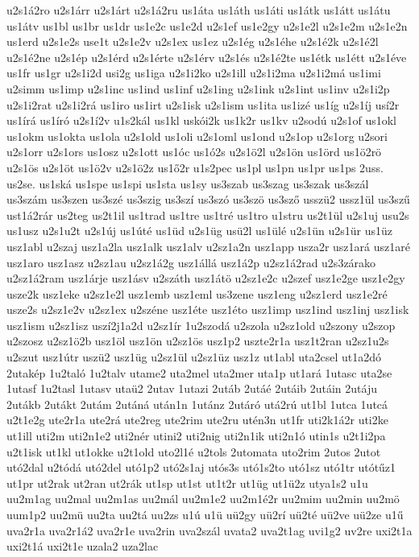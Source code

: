 {u2s1á2ro
u2s1árr
u2s1árt
u2s1á2ru
us1áta
us1áth
us1áti
us1átk
us1átt
us1átu
us1átv
us1bl
us1br
us1dr
us1e2c
us1e2d
u2s1ef
us1e2gy
u2s1e2l
u2s1e2m
u2s1e2n
us1erd
u2s1e2s
use1t
u2s1e2v
u2s1ex
us1ez
u2s1ég
u2s1éhe
u2s1é2k
u2s1é2l
u2s1é2ne
u2s1ép
u2s1érd
u2s1érte
u2s1érv
u2s1és
u2s1é2te
us1étk
us1étt
u2s1éve
us1fr
us1gr
u2s1i2d
usi2g
us1iga
u2s1i2ko
u2s1ill
u2s1i2ma
u2s1i2má
us1imi
u2simm
us1imp
u2s1inc
us1ind
us1inf
u2s1ing
u2s1ink
u2s1int
us1inv
u2s1i2p
u2s1i2rat
u2s1i2rá
us1iro
us1irt
u2s1isk
u2s1ism
us1ita
us1izé
us1íg
u2s1íj
usí2r
us1írá
us1író
u2s1í2v
u1s2kál
us1kl
uskói2k
us1k2r
us1kv
u2sodú
u2s1of
us1okl
us1okm
us1okta
us1ola
u2s1old
us1oli
u2s1oml
us1ond
u2s1op
u2s1org
u2sori
u2s1orr
u2s1ors
us1osz
u2s1ott
us1óc
us1ó2s
u2s1ö2l
u2s1ön
us1örd
us1ö2rö
u2s1ös
u2s1öt
us1ö2v
u2s1ö2z
us1ő2r
u1s2pec
us1pl
us1pn
us1pr
us1ps
2uss.
us2se.
us1ská
us1spe
us1spi
us1sta
us1sy
us3szab
us3szag
us3szak
us3szál
us3szám
us3szen
us3szé
us3szig
us3szí
us3szó
us3szö
us3sző
usszü2
ussz1ül
us3szű
ust1á2rár
us2teg
us2t1il
us1trad
us1tre
us1tré
us1tro
u1stru
us2t1ül
u2s1uj
usu2s
us1usz
u2s1u2t
u2s1új
us1úté
us1üd
u2s1üg
usü2l
us1ülé
u2s1ün
u2s1ür
us1üz
usz1abl
u2szaj
usz1a2la
usz1alk
usz1alv
u2sz1a2n
usz1app
usza2r
usz1ará
usz1aré
usz1aro
usz1asz
u2sz1au
u2sz1á2g
usz1állá
usz1á2p
u2sz1á2rad
u2s3zárako
u2sz1á2ram
usz1árje
usz1ásv
u2száth
usz1átö
u2sz1e2c
u2szef
usz1e2ge
usz1e2gy
usze2k
usz1eke
u2sz1e2l
usz1emb
usz1eml
us3zene
usz1eng
u2sz1erd
usz1e2ré
usze2s
u2sz1e2v
u2sz1ex
u2széne
usz1éte
usz1éto
usz1imp
usz1ind
usz1inj
usz1isk
usz1ism
u2sz1isz
uszí2j1a2d
u2sz1ír
1u2szodá
u2szola
u2sz1old
u2szony
u2szop
u2szosz
u2sz1ö2b
usz1öl
usz1ön
u2sz1ös
usz1p2
uszte2r1a
usz1t2ran
u2sz1u2s
u2szut
usz1útr
uszü2
usz1üg
u2sz1ül
u2sz1üz
usz1z
ut1abl
uta2csel
ut1a2dó
2utakép
1u2taló
1u2talv
utame2
uta2mel
uta2mer
uta1p
ut1ará
1utasc
uta2se
1utasf
1u2tasl
1utasv
utaü2
2utav
1utazi
2utáb
2utáé
2utáib
2utáin
2utáju
2utákb
2utákt
2utám
2utáná
után1n
1utánz
2utáró
utá2rú
ut1bl
1utca
1utcá
u2t1e2g
ute2r1a
ute2rá
ute2reg
ute2rim
ute2ru
utén3n
ut1fr
uti2k1á2r
uti2ke
ut1ill
uti2m
uti2n1e2
uti2nér
utini2
uti2nig
uti2n1ik
uti2n1ó
utin1s
u2t1i2pa
u2t1isk
ut1kl
ut1okke
u2t1old
uto2l1é
u2tols
2utomata
uto2rim
2utos
2utot
utó2dal
u2tódá
utó2del
utó1p2
utó2s1aj
utós3s
utó1s2to
utó1sz
utó1tr
utótűz1
ut1pr
ut2rak
ut2ran
ut2rák
ut1sp
ut1st
ut1t2r
ut1üg
ut1ü2z
utya1s2
u1u
uu2m1ag
uu2mal
uu2m1as
uu2mál
uu2m1e2
uu2m1é2r
uu2mim
uu2min
uu2mö
uum1p2
uu2mü
uu2ta
uu2tá
uu2zs
u1ú
u1ü
uü2gy
uü2rí
uü2té
uü2ve
uü2ze
u1ű
uva2r1a
uva2r1á2
uva2r1e
uva2rin
uva2szál
uvata2
uva2t1ag
uvi1g2
uv2re
uxi2t1a
uxi2t1á
uxi2t1e
uzala2
uza2lac
}
